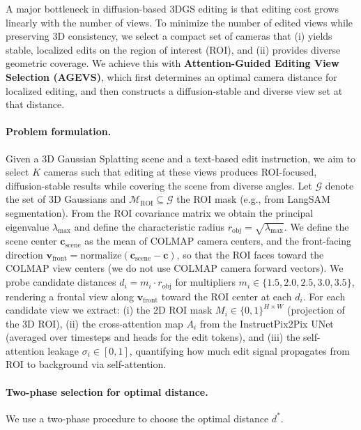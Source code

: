 
A major bottleneck in diffusion-based 3DGS editing is that editing cost grows linearly with the number of views.
To minimize the number of edited views while preserving 3D consistency, we select a compact set of cameras that (i) yields stable, localized edits on the region of interest (ROI), and (ii) provides diverse geometric coverage.
We achieve this with \textbf{Attention-Guided Editing View Selection (AGEVS)}, which first determines an optimal camera distance for localized editing, and then constructs a diffusion-stable and diverse view set at that distance.

\paragraph{Problem formulation.}
Given a 3D Gaussian Splatting scene and a text-based edit instruction, we aim to select $K$ cameras such that editing at these views produces ROI-focused, diffusion-stable results while covering the scene from diverse angles.
Let $\mathcal{G}$ denote the set of 3D Gaussians and $\mathcal{M}_{\text{ROI}} \subseteq \mathcal{G}$ the ROI mask (e.g., from LangSAM segmentation).
From the ROI covariance matrix we obtain the principal eigenvalue $\lambda_{\max}$ and define the characteristic radius $r_{\text{obj}} = \sqrt{\lambda_{\max}}$.
We define the scene center $\mathbf{c}_{\text{scene}}$ as the mean of COLMAP camera centers, and the front-facing direction $\mathbf{v}_{\text{front}} = \mathrm{normalize}(\mathbf{c}_{\text{scene}} - \mathbf{c})$, so that the ROI faces toward the COLMAP view centers (we do not use COLMAP camera forward vectors).
We probe candidate distances $d_i = m_i \cdot r_{\text{obj}}$ for multipliers $m_i \in \{1.5, 2.0, 2.5, 3.0, 3.5\}$, rendering a frontal view along $\mathbf{v}_{\text{front}}$ toward the ROI center at each $d_i$.
For each candidate view we extract: (i) the 2D ROI mask $M_i \in \{0,1\}^{H \times W}$ (projection of the 3D ROI), (ii) the cross-attention map $A_i$ from the InstructPix2Pix UNet (averaged over timesteps and heads for the edit tokens), and (iii) the self-attention leakage $\sigma_i \in [0,1]$, quantifying how much edit signal propagates from ROI to background via self-attention.

\paragraph{Two-phase selection for optimal distance.}
We use a two-phase procedure to choose the optimal distance $d^*$.

